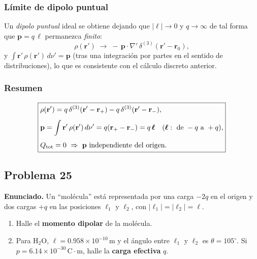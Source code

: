 \documentclass{article}
\begin{document}
\subsubsection*{Límite de dipolo puntual}
Un \emph{dipolo puntual} ideal se obtiene dejando que $|\boldsymbol{\ell}|\to 0$ y $q\to\infty$ de tal forma que $\mathbf p=q\,\boldsymbol{\ell}$ permanezca \emph{finito}:
\[
\rho(\mathbf r') \;\to\; -\,\mathbf p\cdot\nabla'\,\delta^{(3)}(\mathbf r'-\mathbf r_{0}),
\]
y $\displaystyle \int \mathbf r'\,\rho(\mathbf r')\,d\nu'=\mathbf p$ (tras una integración por partes en el sentido de distribuciones), lo que es consistente con el cálculo discreto anterior.

\subsubsection*{Resumen}
\[
\boxed{
\begin{aligned}
&\rho(\mathbf r')=q\,\delta^{(3)}(\mathbf r'-\mathbf r_{+})-q\,\delta^{(3)}(\mathbf r'-\mathbf r_{-}),\\[4pt]
&\mathbf p=\displaystyle\int \mathbf r'\,\rho(\mathbf r')\,d\nu'=q(\mathbf r_{+}-\mathbf r_{-})
= q\,\boldsymbol{\ell}\ \ \ (\boldsymbol{\ell}:\ \text{de }-q\text{ a }+q),\\[4pt]
&Q_{\rm tot}=0\ \Rightarrow\ \mathbf p\ \text{independiente del origen.}
\end{aligned}}
\]


\subsection{Problema 25} \vspace{0.5cm}

\textbf{Enunciado.} Un “molécula” está representada por una carga $-2q$ en el origen y dos cargas $+q$ en las posiciones $\boldsymbol{\ell}_1$ y $\boldsymbol{\ell}_2$, con $\lvert \boldsymbol{\ell}_1\rvert=\lvert \boldsymbol{\ell}_2\rvert=\ell$.
\begin{enumerate}[label=(\alph*)]
  \item Halle el \textbf{momento dipolar} de la molécula.
  \item Para $\mathrm{H_2O}$, $\ell=0.958\times 10^{-10}\,\mathrm{m}$ y el ángulo entre $\boldsymbol{\ell}_1$ y $\boldsymbol{\ell}_2$ es $\theta=105^\circ$. Si $p=6.14\times 10^{-30}\,\mathrm{C\cdot m}$, halle la \textbf{carga efectiva} $q$.
\end{enumerate}
\end{document}
